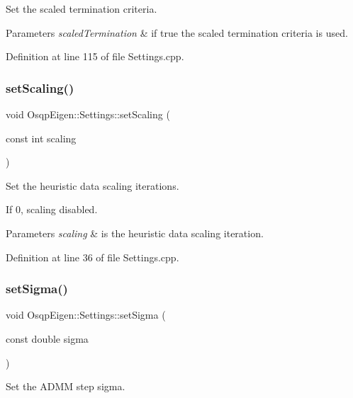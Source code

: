 Set the scaled termination criteria. 


\begin{DoxyParams}{Parameters}
{\em scaled\+Termination} & if true the scaled termination criteria is used. \\
\hline
\end{DoxyParams}


Definition at line 115 of file Settings.\+cpp.

\mbox{\label{classOsqpEigen_1_1Settings_a879a1fec8d21859d4cdcaafdb6df4554}} 
\subsubsection{\texorpdfstring{set\+Scaling()}{setScaling()}}
{\footnotesize\ttfamily void Osqp\+Eigen\+::\+Settings\+::set\+Scaling (\begin{DoxyParamCaption}\item[{const int}]{scaling }\end{DoxyParamCaption})}



Set the heuristic data scaling iterations. 

If 0, scaling disabled. 
\begin{DoxyParams}{Parameters}
{\em scaling} & is the heuristic data scaling iteration. \\
\hline
\end{DoxyParams}


Definition at line 36 of file Settings.\+cpp.

\mbox{\label{classOsqpEigen_1_1Settings_a59dc6a98b52eece19846a77a00036b5a}} 
\subsubsection{\texorpdfstring{set\+Sigma()}{setSigma()}}
{\footnotesize\ttfamily void Osqp\+Eigen\+::\+Settings\+::set\+Sigma (\begin{DoxyParamCaption}\item[{const double}]{sigma }\end{DoxyParamCaption})}



Set the A\+D\+MM step sigma. 


